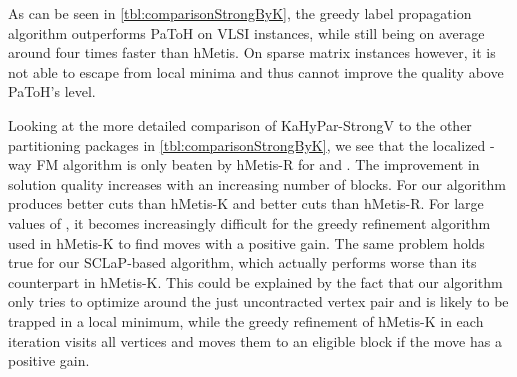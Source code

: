 \documentclass[runningheads,a4paper]{llncs}
\begin{document}
As can be seen in \autoref{tbl:comparisonStrongByK}, the greedy label propagation algorithm outperforms PaToH on VLSI instances, while still being on average
around four times faster than hMetis. On sparse matrix instances however, it is not able to escape from local minima and thus cannot improve the quality
above PaToH's level.  

Looking at the more detailed comparison of KaHyPar-StrongV to the other partitioning packages in \autoref{tbl:comparisonStrongByK}, we see that the localized -way
FM algorithm is only beaten by hMetis-R for  and . The improvement in solution quality increases with an increasing number of blocks. For  our algorithm
produces  better cuts than hMetis-K and  better cuts than hMetis-R.
For large values of , it becomes increasingly difficult for the greedy refinement algorithm used in hMetis-K to find moves with a positive gain.
The same problem holds true for our SCLaP-based algorithm, which actually performs worse than its counterpart in hMetis-K.
This could be explained by the fact that our algorithm only tries to optimize around the just uncontracted vertex pair and is likely to be trapped in a local
minimum, while the greedy refinement of hMetis-K in each iteration visits all vertices and moves them to an eligible block if the move has a positive gain. 
\end{document}
